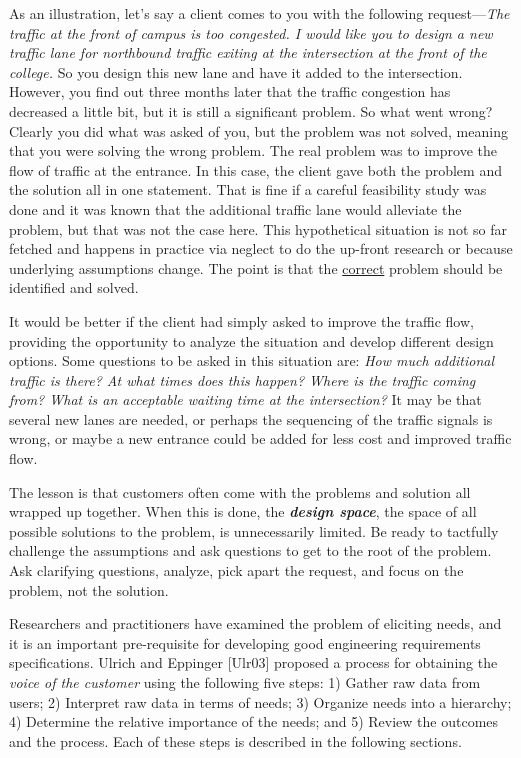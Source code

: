 As an illustration, let's say a client comes to you with the following
request---\emph{The traffic at the front of campus is too congested. I
would like you to design a new traffic lane for northbound traffic
exiting at the intersection at the front of the college.} So you design
this new lane and have it added to the intersection. However, you find
out three months later that the traffic congestion has decreased a
little bit, but it is still a significant problem. So what went wrong?
Clearly you did what was asked of you, but the problem was not solved,
meaning that you were solving the wrong problem. The real problem was to
improve the flow of traffic at the entrance. In this case, the client
gave both the problem and the solution all in one statement. That is
fine if a careful feasibility study was done and it was known that the
additional traffic lane would alleviate the problem, but that was not
the case here. This hypothetical situation is not so far fetched and
happens in practice via neglect to do the up-front research or because
underlying assumptions change. The point is that the \ul{correct}
problem should be identified and solved.

It would be better if the client had simply asked to improve the traffic
flow, providing the opportunity to analyze the situation and develop
different design options. Some questions to be asked in this situation
are: \emph{How much additional traffic is there? At what times does this
happen? Where is the traffic coming from? What is an acceptable waiting
time at the intersection?} It may be that several new lanes are needed,
or perhaps the sequencing of the traffic signals is wrong, or maybe a
new entrance could be added for less cost and improved traffic flow.

The lesson is that customers often come with the problems and solution
all wrapped up together. When this is done, the \emph{\textbf{design
space}}, the space of all possible solutions to the problem, is
unnecessarily limited. Be ready to tactfully challenge the assumptions
and ask questions to get to the root of the problem. Ask clarifying
questions, analyze, pick apart the request, and focus on the problem,
not the solution.

Researchers and practitioners have examined the problem of eliciting
needs, and it is an important pre-requisite for developing good
engineering requirements specifications. Ulrich and Eppinger {[}Ulr03{]}
proposed a process for obtaining the \emph{voice of the customer} using
the following five steps: 1) Gather raw data from users; 2) Interpret
raw data in terms of needs; 3) Organize needs into a hierarchy; 4)
Determine the relative importance of the needs; and 5) Review the
outcomes and the process. Each of these steps is described in the
following sections.

